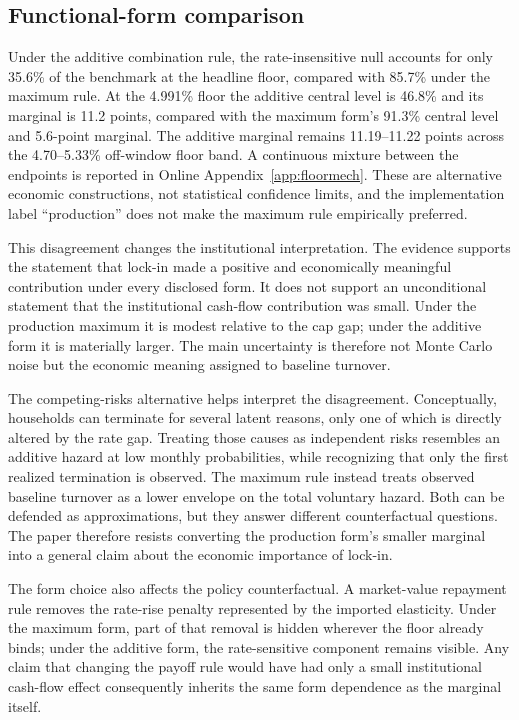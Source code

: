 \subsection{Functional-form comparison}

Under the additive combination rule, the rate-insensitive null accounts for only 35.6\% of the benchmark at the headline floor, compared with 85.7\% under the maximum rule. At the 4.991\% floor the additive central level is 46.8\% and its marginal is 11.2 points, compared with the maximum form's 91.3\% central level and 5.6-point marginal. The additive marginal remains 11.19--11.22 points across the 4.70--5.33\% off-window floor band. A continuous mixture between the endpoints is reported in Online Appendix~\ref{app:floormech}. These are alternative economic constructions, not statistical confidence limits, and the implementation label ``production'' does not make the maximum rule empirically preferred.

This disagreement changes the institutional interpretation. The evidence supports the statement that lock-in made a positive and economically meaningful contribution under every disclosed form. It does not support an unconditional statement that the institutional cash-flow contribution was small. Under the production maximum it is modest relative to the cap gap; under the additive form it is materially larger. The main uncertainty is therefore not Monte Carlo noise but the economic meaning assigned to baseline turnover.

The competing-risks alternative helps interpret the disagreement. Conceptually, households can terminate for several latent reasons, only one of which is directly altered by the rate gap. Treating those causes as independent risks resembles an additive hazard at low monthly probabilities, while recognizing that only the first realized termination is observed. The maximum rule instead treats observed baseline turnover as a lower envelope on the total voluntary hazard. Both can be defended as approximations, but they answer different counterfactual questions. The paper therefore resists converting the production form's smaller marginal into a general claim about the economic importance of lock-in.

The form choice also affects the policy counterfactual. A market-value repayment rule removes the rate-rise penalty represented by the imported elasticity. Under the maximum form, part of that removal is hidden wherever the floor already binds; under the additive form, the rate-sensitive component remains visible. Any claim that changing the payoff rule would have had only a small institutional cash-flow effect consequently inherits the same form dependence as the marginal itself.

